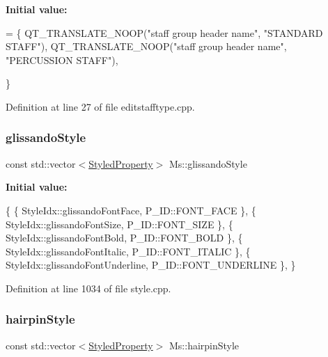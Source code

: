 {\bfseries Initial value\+:}
\begin{DoxyCode}
= \{
      QT\_TRANSLATE\_NOOP(\textcolor{stringliteral}{"staff group header name"}, \textcolor{stringliteral}{"STANDARD STAFF"}),
      QT\_TRANSLATE\_NOOP(\textcolor{stringliteral}{"staff group header name"}, \textcolor{stringliteral}{"PERCUSSION STAFF"}),

      \}
\end{DoxyCode}


Definition at line 27 of file editstafftype.\+cpp.

\mbox{\label{namespace_ms_aaf93bcb00157ab25b7b496a1fd3b9cbe}} 
\subsubsection{\texorpdfstring{glissando\+Style}{glissandoStyle}}
{\footnotesize\ttfamily const std\+::vector$<$\hyperlink{struct_ms_1_1_styled_property}{Styled\+Property}$>$ Ms\+::glissando\+Style}

{\bfseries Initial value\+:}
\begin{DoxyCode}
\{
      \{ StyleIdx::glissandoFontFace,                  P\_ID::FONT\_FACE              \},
      \{ StyleIdx::glissandoFontSize,                  P\_ID::FONT\_SIZE              \},
      \{ StyleIdx::glissandoFontBold,                  P\_ID::FONT\_BOLD              \},
      \{ StyleIdx::glissandoFontItalic,                P\_ID::FONT\_ITALIC            \},
      \{ StyleIdx::glissandoFontUnderline,             P\_ID::FONT\_UNDERLINE         \},
      \}
\end{DoxyCode}


Definition at line 1034 of file style.\+cpp.

\mbox{\label{namespace_ms_a1e364a94879389ae819c630351d8776f}} 
\subsubsection{\texorpdfstring{hairpin\+Style}{hairpinStyle}}
{\footnotesize\ttfamily const std\+::vector$<$\hyperlink{struct_ms_1_1_styled_property}{Styled\+Property}$>$ Ms\+::hairpin\+Style}

